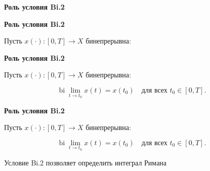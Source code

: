 \documentclass[11pt]{article}
\begin{document}
\newpage

\begin{center}
{\color{notaeYELLOW}\bfseries\fontsize{44}{52}\selectfont Роль условия Bi.2}
\end{center}
\vspace*{\fill}
\begin{center}
\fontsize{36}{43}\selectfont
\end{center}
\vspace*{\fill}

\newpage

\begin{center}
{\color{notaeYELLOW}\bfseries\fontsize{44}{52}\selectfont Роль условия Bi.2}
\end{center}
\vspace*{\fill}
\begin{center}
\fontsize{36}{43}\selectfont
\parbox{\linewidth}{\centering\noindent Пусть $x(\cdot):[0,T]\to X$ бинепрерывна:
\par}\vspace{0.4in}
\end{center}
\vspace*{\fill}

\newpage

\begin{center}
{\color{notaeYELLOW}\bfseries\fontsize{44}{52}\selectfont Роль условия Bi.2}
\end{center}
\vspace*{\fill}
\begin{center}
\fontsize{36}{43}\selectfont
\parbox{\linewidth}{\centering\noindent Пусть $x(\cdot):[0,T]\to X$ бинепрерывна:
\par}\vspace{0.4in}
\parbox{\linewidth}{\centering\noindent $$\operatorname{bi}\lim\limits_{t\to t_0}x(t)=x(t_0)\quad\text{для всех }t_0\in[0,T].$$
\par}\vspace{0.4in}
\end{center}
\vspace*{\fill}

\newpage

\begin{center}
{\color{notaeYELLOW}\bfseries\fontsize{44}{52}\selectfont Роль условия Bi.2}
\end{center}
\vspace*{\fill}
\begin{center}
\fontsize{36}{43}\selectfont
\parbox{\linewidth}{\centering\noindent Пусть $x(\cdot):[0,T]\to X$ бинепрерывна:
\par}\vspace{0.4in}
\parbox{\linewidth}{\centering\noindent $$\operatorname{bi}\lim\limits_{t\to t_0}x(t)=x(t_0)\quad\text{для всех }t_0\in[0,T].$$
\par}\vspace{0.4in}
\parbox{\linewidth}{\centering\noindent Условие Bi.2 позволяет определить интеграл Римана
\par}\vspace{0.4in}
\end{center}
\vspace*{\fill}
\end{document}
